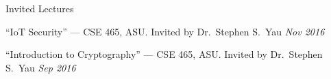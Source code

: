 
\begin{rBulletSubsection}{Invited Lectures}

  \item ``IoT Security'' --- CSE 465, ASU\@. Invited by Dr.\ Stephen S.\ Yau \hfill \emph{Nov 2016}

  \item ``Introduction to Cryptography'' --- CSE 465, ASU\@. Invited by Dr.\ Stephen S.\ Yau \hfill \emph{Sep 2016}




\end{rBulletSubsection}
